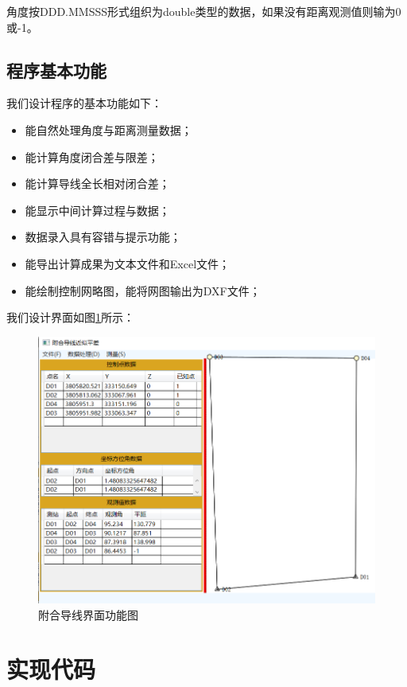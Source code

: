 角度按DDD.MMSSS形式组织为double类型的数据，如果没有距离观测值则输为0或-1。

\subsection{程序基本功能}

我们设计程序的基本功能如下：
\begin{itemize}
\item 能自然处理角度与距离测量数据；
\item  能计算角度闭合差与限差；
\item  能计算导线全长相对闭合差；
\item  能显示中间计算过程与数据；
\item  数据录入具有容错与提示功能；
\item  能导出计算成果为文本文件和Excel文件；
\item  能绘制控制网略图，能将网图输出为DXF文件；
\end{itemize}

我们设计界面如图\ref{fig:ctUI01}所示：

\begin{figure}[htbp]
	\centering
	\includegraphics[scale=0.8]{chapter/connectingtraverse/ctUI01.png}
	\caption{附合导线界面功能图}
	\label{fig:ctUI01}
\end{figure}

\section{实现代码}

